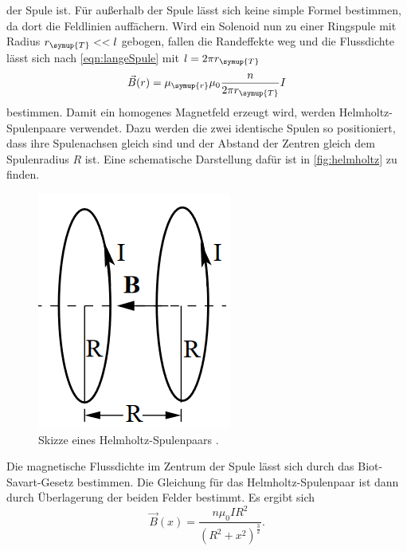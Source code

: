 der Spule ist. Für außerhalb der Spule lässt sich keine simple Formel bestimmen, da dort die Feldlinien
auffächern. Wird ein Solenoid nun zu einer Ringspule mit Radius $r_{\symup{T}} << l$ gebogen, fallen die
Randeffekte weg und die Flussdichte lässt sich nach \autoref{eqn:langeSpule} mit $l = 2\pi r_{\symup{T}}$
\begin{equation}
    \label{eqn:ringspule}
    \vec{B}(r) = \mu_{\symup{r}}\mu_0 \frac{n}{2\pi r_{\symup{T}}} I
\end{equation}
bestimmen. Damit ein homogenes Magnetfeld erzeugt wird, werden Helmholtz-Spulenpaare verwendet. Dazu werden
die zwei identische Spulen so positioniert, dass ihre Spulenachsen gleich sind und der Abstand der Zentren
gleich dem Spulenradius $R$ ist. Eine schematische Darstellung dafür ist in \autoref{fig:helmholtz} zu finden.
\begin{figure}
    \centering
    \includegraphics[scale=0.5]{helmholtzspulenpaar.png}
    \caption{Skizze eines Helmholtz-Spulenpaars \cite{sample}.}
    \label{fig:helmholtz}
\end{figure}
Die magnetische Flussdichte im Zentrum der Spule lässt sich durch das Biot-Savart-Gesetz bestimmen.
Die Gleichung für das Helmholtz-Spulenpaar ist dann durch Überlagerung der beiden Felder bestimmt.
Es ergibt sich
\begin{equation}
    \label{eqn:helmholtz}
    \vec{B}(x) = \frac{n\mu_0 I R^2}{(R^2+x^2)^{\frac{3}{2}}}.
\end{equation}

